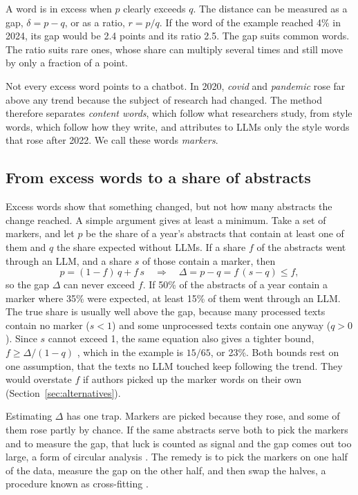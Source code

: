 \documentclass[12pt]{article}
\newcommand{\w}[1]{\textit{#1}}
\begin{document}
A word is in excess when $p$ clearly exceeds $q$. The distance can be measured as a gap,
$\delta = p - q$, or as a ratio, $r = p/q$. If the word of the example reached 4\% in 2024, its gap
would be 2.4 points and its ratio 2.5. The gap suits common words. The ratio suits rare ones, whose
share can multiply several times and still move by only a fraction of a point.

Not every excess word points to a chatbot. In 2020, \w{covid} and \w{pandemic} rose far above any
trend because the subject of research had changed. The method therefore separates \emph{content
words}, which follow what researchers study, from style words, which follow how they write, and
attributes to LLMs only the style words that rose after 2022. We call these words \emph{markers}.

\subsection{From excess words to a share of abstracts}
\label{sec:bound-theory}

Excess words show that something changed, but not how many abstracts the change reached. A simple
argument gives at least a minimum. Take a set of markers, and let $p$ be the share of a year's
abstracts that contain at least one of them and $q$ the share expected without LLMs. If a share $f$
of the abstracts went through an LLM, and a share $s$ of those contain a marker, then
\begin{equation}
  p = (1-f)\,q + f\,s
  \quad\Longrightarrow\quad
  \Delta = p - q = f\,(s - q) \le f,
  \label{eq:bound}
\end{equation}
so the gap $\Delta$ can never exceed $f$. If 50\% of the abstracts of a year contain a marker where
35\% were expected, at least 15\% of them went through an LLM. The true share is usually well above
the gap, because many processed texts contain no marker ($s < 1$) and some unprocessed texts contain
one anyway ($q > 0$). Since $s$ cannot exceed 1, the same equation also gives a tighter bound,
$f \ge \Delta/(1-q)$ \cite{holzwarth2026most}, which in the example is $15/65$, or 23\%. Both bounds
rest on one assumption, that the texts no LLM touched keep following the trend. They would overstate
$f$ if authors picked up the marker words on their own (Section~\ref{sec:alternatives}).

Estimating $\Delta$ has one trap. Markers are picked because they rose, and some of them rose partly
by chance. If the same abstracts serve both to pick the markers and to measure the gap, that luck is
counted as signal and the gap comes out too large, a form of circular analysis
\cite{kriegeskorte2009circular}. The remedy is to pick the markers on one half of the data, measure
the gap on the other half, and then swap the halves, a procedure known as cross-fitting
\cite{chernozhukov2018double}.
\end{document}
